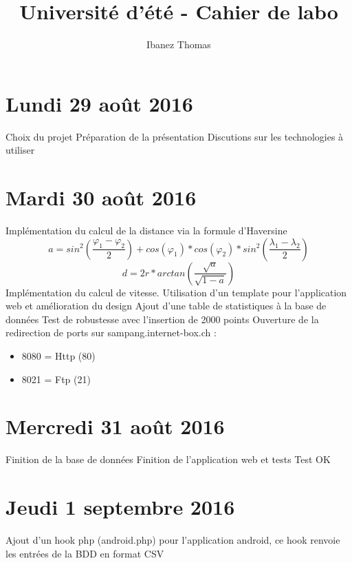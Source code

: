\documentclass[a4paper,11pt]{article}
\title{Université d'été - Cahier de labo}
\author{Ibanez Thomas}
\begin{document}
\maketitle
\section{Lundi 29 août 2016}
Choix du projet \newline
Préparation de la présentation \newline
Discutions sur les technologies à utiliser

\section{Mardi 30 août 2016}
Implémentation du calcul de la distance via la formule d'Haversine
\begin{equation*}
a = sin^2(\frac{\varphi_1 - \varphi_2}{2}) + cos(\varphi_1) * cos(\varphi_2) * sin^2(\frac{\lambda_1 - \lambda_2}{2})
\end{equation*}
\begin{equation*}
d = 2r *arctan\left(\frac{\sqrt{a}}{\sqrt{1-a}}\right)
\end{equation*}
Implémentation du calcul de vitesse. \newline
Utilisation d'un template pour l'application web et amélioration du design
Ajout d'une table de statistiques à la base de données \newline
Test de robustesse avec l'insertion de 2000 points \newline
Ouverture de la redirection de ports sur sampang.internet-box.ch :
\begin{itemize}
\item 8080 = Http (80)
\item 8021 = Ftp (21)
\end{itemize}
\section{Mercredi 31 août 2016}
Finition de la base de données\newline
Finition de l'application web et tests\newline
Test OK
\section{Jeudi 1 septembre 2016}
Ajout d'un hook php (android.php) pour l'application android, ce hook renvoie les entrées de la BDD en format CSV \newline
\end{document}

